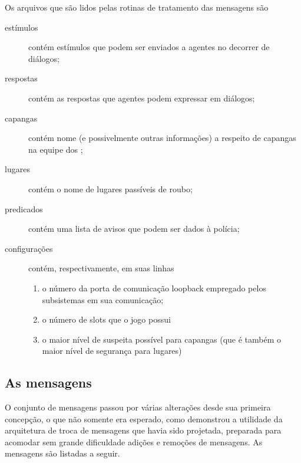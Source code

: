 Os arquivos que são lidos pelas rotinas de tratamento das mensagens são
\begin{description}
\item[estímulos] contém estímulos que podem ser enviados a agentes no decorrer de diálogos;
\item[respostas] contém as respostas que agentes podem expressar em diálogos;
\item[capangas] contém nome (e possivelmente outras informações) a respeito de capangas na equipe dos \nomeGrupo;
\item[lugares] contém o nome de lugares passíveis de roubo;
\item[predicados] contém uma lista de avisos que podem ser dados à polícia;
\item[configurações] contém, respectivamente, em suas linhas
\begin{enumerate}
\item o número da porta de comunicação loopback empregado pelos subsistemas em sua comunicação;
\item o número de slots que o jogo possui
\item o maior nível de suspeita possível para capangas (que é também o maior nível de segurança para lugares)
\end{enumerate}
\end{description}

\subsection{As mensagens}

O conjunto de mensagens passou por várias alterações desde sua primeira concepção, o que não somente era esperado, como demonstrou a utilidade da arquitetura de troca de mensagens que havia sido projetada, preparada para acomodar sem grande dificuldade adições e remoções de mensagens. As mensagens são listadas a seguir.

